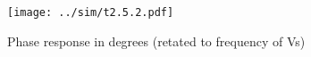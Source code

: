 \begin{figure}[h] \centering
\texttt{[image: ../sim/t2.5.2.pdf]}
\caption{Phase response in degrees (retated to frequency of Vs)}
\label{fig:acp}
\end{figure}








